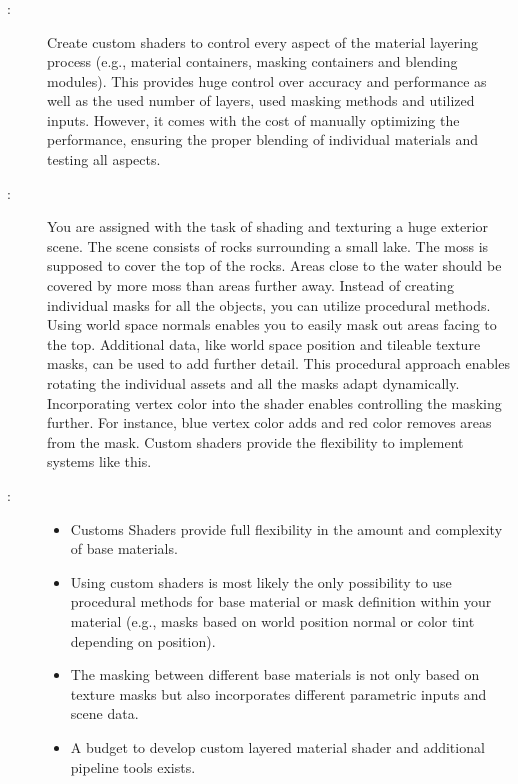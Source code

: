 \subsubsection{\patImplementationCustomShader}\label{\patImplementationCustomShader}
\begin{description}
	\item[\patIntent:]%
	Create custom shaders to control every aspect of the material layering process (e.g., material containers, masking containers and blending modules). This provides huge control over accuracy and performance as well as the used number of layers, used masking methods and utilized inputs. However, it comes with the cost of manually optimizing the performance, ensuring the proper blending of individual materials and testing all aspects.  
	\item[\patMotivation:]%
	You are assigned with the task of shading and texturing a huge exterior scene. The scene consists of rocks surrounding a small lake. The moss is supposed to cover the top of the rocks. Areas close to the water should be covered by more moss than areas further away. Instead of creating individual masks for all the objects, you can utilize procedural methods. Using world space normals enables you to easily mask out areas facing to the top. Additional data, like world space position and tileable texture masks, can be used to add further detail. This procedural approach enables rotating the individual assets and all the masks adapt dynamically. Incorporating vertex color into the shader enables controlling the masking further. For instance, blue vertex color adds and red color removes  areas from the mask. Custom shaders provide the flexibility to implement systems like this.
	\item[\patApplicability:]\hfill
	\begin{itemize}\mynobreakpar
		\item Customs Shaders provide full flexibility in the amount and complexity of base materials. 
		\item Using custom shaders is most likely the only possibility to use procedural methods for base material or mask definition within your material (e.g., masks based on world position normal or color tint depending on position). 
		\item The masking between different base materials is not only based on texture masks but also incorporates different parametric inputs and scene data. 
		\item A budget to develop custom layered material shader and additional pipeline tools exists.

\end{itemize}
\end{description}
